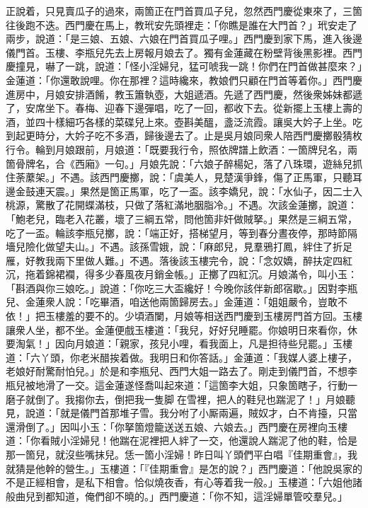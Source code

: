 正說着，只見賣瓜子的過來，{}兩箇正在門首買瓜子兒，忽然西門慶從東來了，三箇往後跑不迭。西門慶在馬上，教玳安先頭裡走：「你瞧是誰在大門首？」玳安走了兩步，說道：「是三娘、五娘、六娘在門首買瓜子哩。」西門慶到家下馬，進入後邊儀門首。玉樓、李瓶兒先去上房報月娘去了。獨有金蓮藏在粉壁背後黑影裡。西門慶撞見，嚇了一跳，說道：「怪小淫婦兒，猛可唬我一跳！你們在門首做甚麼來？」金蓮道：「你還敢說哩。你在那裡？這時纔來，教娘們只顧在門首等着你。」西門慶進房中，月娘安排酒餚，教玉簫執壺，大姐遞酒。先遞了西門慶，然後衆姊妹都遞了，安席坐下。春梅、迎春下邊彈唱，吃了一回，都收下去。從新擺上玉樓上壽的酒，並四十樣細巧各樣的菜碟兒上來。壺斟美醞，盞泛流霞。讓吳大妗子上坐。吃到起更時分，大妗子吃不多酒，歸後邊去了。止是吳月娘同衆人陪西門慶擲骰猜枚行令。輪到月娘跟前，月娘道：「既要我行令，照依牌譜上飲酒：一箇牌兒名，兩箇骨牌名，合《西廂》一句。」月娘先說：「六娘子醉楊妃，落了八珠環，遊絲兒抓住荼䕷架。」不遇。該西門慶擲，說：「虞美人，見楚漢爭鋒，傷了正馬軍，只聽耳邊金鼓連天震。」果然是箇正馬軍，吃了一盃。該李嬌兒，說：「水仙子，因二士入桃源，驚散了花開蝶滿枝，只做了落紅滿地胭脂冷。」不遇。次該金蓮擲，說道：「鮑老兒，臨老入花叢，壞了三綱五常，問他箇非奸做賊拏。」{}果然是三綱五常，吃了一盃。輪該李瓶兒擲，說：「端正好，搭梯望月，等到春分晝夜停，那時節隔墻兒險化做望夫山。」不遇。該孫雪娥，說：「麻郎兒，見羣鴉打鳳，絆住了折足雁，好教我兩下里做人難。」不遇。落後該玉樓完令，說：「念奴嬌，醉扶定四紅沉，拖着錦裙襴，得多少春風夜月銷金帳。」正擲了四紅沉。月娘滿令，叫小玉：「斟酒與你三娘吃。」說道：「你吃三大盃纔好！今晚你該伴新郎宿歇。」因對李瓶兒、金蓮衆人說：「吃畢酒，咱送他兩箇歸房去。」金蓮道：「姐姐嚴令，豈敢不依！」把玉樓羞的要不的。少頃酒闌，月娘等相送西門慶到玉樓房門首方回。玉樓讓衆人坐，都不坐。金蓮便戲玉樓道：「我兒，好好兒睡罷。你娘明日來看你，休要淘氣！」因向月娘道：「親家，孩兒小哩，看我面上，凡是担待些兒罷。」玉樓道：「六丫頭，你老米醋挨着做。我明日和你答話。」金蓮道：「我媒人婆上樓子，老娘好耐驚耐怕兒。」於是和李瓶兒、西門大姐一路去了。剛走到儀門首，不想李瓶兒被地滑了一交。這金蓮遂怪喬叫起來道：「這箇李大姐，只象箇瞎子，行動一磨子就倒了。我搊你去，倒把我一隻脚𨃓在雪裡，把人的鞋兒也踹泥了！」月娘聽見，說道：「就是儀門首那堆子雪。我分咐了小厮兩遍，賊奴才，白不肯擡，只當還滑倒了。」因叫小玉：「你拏箇燈籠送送五娘、六娘去。」西門慶在房裡向玉樓道：「你看賊小淫婦兒！他踹在泥裡把人絆了一交，他還說人踹泥了他的鞋，恰是那一箇兒，就沒些嘴抹兒。恁一箇小淫婦！昨日叫丫頭們平白唱『佳期重會』，我就猜是他幹的營生。」玉樓道：「『佳期重會』是怎的說？」西門慶道：「他說吳家的不是正經相會，是私下相會。恰似燒夜香，有心等着我一般。」{}玉樓道：「六姐他諸般曲兒到都知道，俺們卻不曉的。」西門慶道：「你不知，這淫婦單管咬羣兒。」

